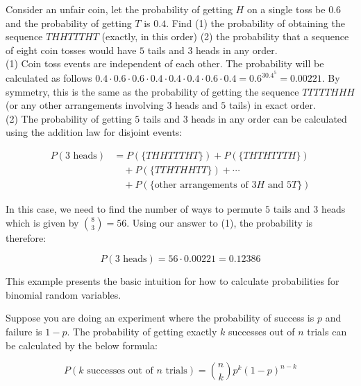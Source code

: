 \documentclass[12pt, a4paper]{article}
\newcounter{exa}
\begin{document}
\begin{texample}
Consider an unfair coin, let the probability of getting $H$ on a single toss be $0.6$ and the probability of getting $T$ is $0.4$. Find (1) the probability of obtaining the sequence $THHTTTHT$ (exactly, in this order) (2) the probability that a sequence of eight coin tosses would have $5$ tails and $3$ heads in any order. \\

(1) Coin toss events are independent of each other. The probability will be calculated as follows $0.4\cdot0.6\cdot0.6\cdot0.4\cdot0.4\cdot0.4\cdot0.6\cdot0.4=0.6^30.4^5=0.00221$. By symmetry, this is the same as the probability of getting the sequence $TTTTTHHH$ (or any other arrangements involving $3$ heads and $5$ tails) in exact order. \\

(2) The probability of getting $5$ tails and $3$ heads in any order can be calculated using the addition law for disjoint events:

\begin{align*}
P(\text{$3$ heads})&=P(\{THHTTTHT\}) + P(\{THTHTTTH\}) \\
&\quad+ P(\{TTHTHHTT\}) + \cdots \\
&\quad + P(\{\text{other arrangements of $3H$ and $5T$}\})
\end{align*}

In this case, we need to find the number of ways to permute $5$ tails and $3$ heads which is given by $\binom{8}{3}=56$. Using our answer to (1), the probability is therefore:

$$P(\text{$3$ heads})=56\cdot0.00221=0.12386$$

This example presents the basic intuition for how to calculate probabilities for binomial random variables.
\end{texample}

Suppose you are doing an experiment where the probability of success is $p$ and failure is $1-p$. The probability of getting exactly $k$ successes out of $n$ trials can be calculated by the below formula:

$$P(\text{$k$ successes out of $n$ trials})=\binom{n}{k}p^k(1-p)^{n-k}$$
\end{document}
